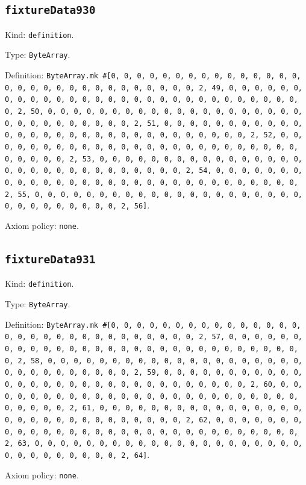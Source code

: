 \documentclass[11pt]{article}
\begin{document}
\subsection*{\texttt{fixtureData930}}
\noindent Kind: \texttt{definition}.\par
\noindent Type: \texttt{ByteArray}.\par
\noindent Definition: \texttt{ByteArray.mk \#[0, 0, 0, 0, 0, 0, 0, 0, 0, 0, 0, 0, 0, 0, 0, 0, 0, 0, 0, 0, 0, 0, 0, 0, 0, 0, 0, 0, 0, 0, 2, 49, 0, 0, 0, 0, 0, 0, 0, 0, 0, 0, 0, 0, 0, 0, 0, 0, 0, 0, 0, 0, 0, 0, 0, 0, 0, 0, 0, 0, 0, 0, 2, 50, 0, 0, 0, 0, 0, 0, 0, 0, 0, 0, 0, 0, 0, 0, 0, 0, 0, 0, 0, 0, 0, 0, 0, 0, 0, 0, 0, 0, 0, 0, 2, 51, 0, 0, 0, 0, 0, 0, 0, 0, 0, 0, 0, 0, 0, 0, 0, 0, 0, 0, 0, 0, 0, 0, 0, 0, 0, 0, 0, 0, 0, 0, 2, 52, 0, 0, 0, 0, 0, 0, 0, 0, 0, 0, 0, 0, 0, 0, 0, 0, 0, 0, 0, 0, 0, 0, 0, 0, 0, 0, 0, 0, 0, 0, 2, 53, 0, 0, 0, 0, 0, 0, 0, 0, 0, 0, 0, 0, 0, 0, 0, 0, 0, 0, 0, 0, 0, 0, 0, 0, 0, 0, 0, 0, 0, 0, 2, 54, 0, 0, 0, 0, 0, 0, 0, 0, 0, 0, 0, 0, 0, 0, 0, 0, 0, 0, 0, 0, 0, 0, 0, 0, 0, 0, 0, 0, 0, 0, 2, 55, 0, 0, 0, 0, 0, 0, 0, 0, 0, 0, 0, 0, 0, 0, 0, 0, 0, 0, 0, 0, 0, 0, 0, 0, 0, 0, 0, 0, 0, 0, 2, 56]}.\par
\noindent Axiom policy: \texttt{none}.\par
\subsection*{\texttt{fixtureData931}}
\noindent Kind: \texttt{definition}.\par
\noindent Type: \texttt{ByteArray}.\par
\noindent Definition: \texttt{ByteArray.mk \#[0, 0, 0, 0, 0, 0, 0, 0, 0, 0, 0, 0, 0, 0, 0, 0, 0, 0, 0, 0, 0, 0, 0, 0, 0, 0, 0, 0, 0, 0, 2, 57, 0, 0, 0, 0, 0, 0, 0, 0, 0, 0, 0, 0, 0, 0, 0, 0, 0, 0, 0, 0, 0, 0, 0, 0, 0, 0, 0, 0, 0, 0, 2, 58, 0, 0, 0, 0, 0, 0, 0, 0, 0, 0, 0, 0, 0, 0, 0, 0, 0, 0, 0, 0, 0, 0, 0, 0, 0, 0, 0, 0, 0, 0, 2, 59, 0, 0, 0, 0, 0, 0, 0, 0, 0, 0, 0, 0, 0, 0, 0, 0, 0, 0, 0, 0, 0, 0, 0, 0, 0, 0, 0, 0, 0, 0, 2, 60, 0, 0, 0, 0, 0, 0, 0, 0, 0, 0, 0, 0, 0, 0, 0, 0, 0, 0, 0, 0, 0, 0, 0, 0, 0, 0, 0, 0, 0, 0, 2, 61, 0, 0, 0, 0, 0, 0, 0, 0, 0, 0, 0, 0, 0, 0, 0, 0, 0, 0, 0, 0, 0, 0, 0, 0, 0, 0, 0, 0, 0, 0, 2, 62, 0, 0, 0, 0, 0, 0, 0, 0, 0, 0, 0, 0, 0, 0, 0, 0, 0, 0, 0, 0, 0, 0, 0, 0, 0, 0, 0, 0, 0, 0, 2, 63, 0, 0, 0, 0, 0, 0, 0, 0, 0, 0, 0, 0, 0, 0, 0, 0, 0, 0, 0, 0, 0, 0, 0, 0, 0, 0, 0, 0, 0, 0, 2, 64]}.\par
\noindent Axiom policy: \texttt{none}.\par
\end{document}
